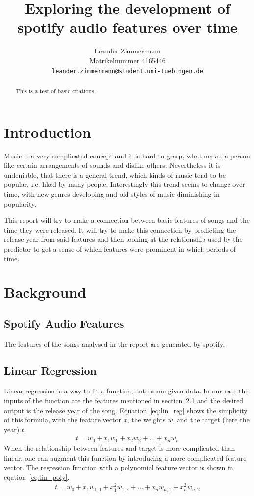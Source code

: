 \documentclass{article}
\title{Exploring the development of spotify audio features over time}
\author{%
  Leander Zimmermann\\
  Matrikelnummer 4165446\\
  \texttt{leander.zimmermann@student.uni-tuebingen.de} \\
}
\begin{document}
\maketitle

\begin{abstract}
  This is a test of basic citations \citet{dataset}.
\end{abstract}

\section{Introduction}

Music is a very complicated concept and it is hard to grasp, what makes a person like certain arrangements of sounds and dislike others. Nevertheless it is undeniable, that there is a general trend, which kinds of music tend to be popular, i.e. liked by many people. Interestingly this trend seems to change over time, with new genres developing and old styles of music diminishing in popularity.

This report will try to make a connection between basic features of songs and the time they were released. It will try to make this connection by predicting the release year from said features and then looking at the relationship used by the predictor to get a sense of which features were prominent in which periods of time.

\section{Background}
\subsection{Spotify Audio Features}\label{sec:features}
The features of the songs analysed in the report are generated by spotify.
\citep{spotify_audio_features} 

\subsection{Linear Regression}
Linear regression is a way to fit a function, onto some given data. In our case the inputs of the function are the features mentioned in section~\ref{sec:features} and the desired output is the release year of the song.
Equation~\ref{eq:lin_reg} shows the simplicity of this formula, with the feature vector $x$, the weights $w$, and the target (here the year) $t$.
\begin{align}
  t = w_0 + x_1w_1 + x_2w_2 + \dots + x_nw_n \label{eq:lin_reg}
\end{align}
When the relationship between features and target is more complicated than linear, one can augment this function by introducing a more complicated feature vector. The regression function with a polynomial feature vector is shown in eqation~\ref{eq:lin_poly}.
\begin{align}
  t = w_0 + x_1w_{1,1} + x_1^2w_{1,2} +  \dots + x_nw_{n,1} + x_n^2w_{n,2} \label{eq:lin_poly}
\end{align}
\end{document}
